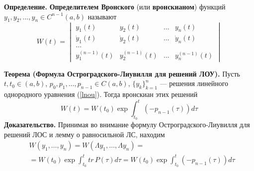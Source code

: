 \documentclass{article}
\begin{document}
\noindent \textbf{Определение.} \textbf{Определителем Вронского} (или \textbf{вронскианом}) функций $y_1, y_2, \ldots, y_n \in C^{n-1}(a,b)$ называют
\begin{equation*}
    W(t) = \begin{vmatrix}
    y_1(t) & y_2(t) & \ldots & y_n(t)\\
    \dot{y}_1(t) & \dot{y}_2(t) & \ldots & \dot{y}_n(t)\\
    \ldots\\
    y_1^{(n-1)}(t) & y_2^{(n-1)}(t) & \ldots & y_n^{(n-1)}(t)
    \end{vmatrix}
\end{equation*}

\noindent \textbf{Теорема (Формула Остроградского-Лиувилля для решений ЛОУ).} Пусть $t, t_0 \in (a,b)$, $p_0, p_1, \ldots, p_{n-1} \in C(a,b)$, $\{y_k\}_{k=1}^n$ --- решения линейного однородного уравнения (\ref{lnou}). Тогда вронскиан этих решений
\begin{equation*}
    W(t) = W(t_0)\exp \int_{t_0}^t (-p_{n-1}(\tau))d\tau
\end{equation*}
\textbf{Доказательство.} Принимая во внимание формулу Остроградского-Лиувилля для решений ЛОС и лемму о равносильной ЛС, находим
\begin{equation*}
    \begin{aligned}
        &W(y_1,\ldots, y_n) = W(\Lambda y_1,\ldots, \Lambda y_n) =\\
        &= W(t_0)\exp \int_{t_0}^t tr\,P(\tau)d\tau = W(t_0)\exp \int_{t_0}^t (-p_{n-1}(\tau))d\tau 
    \end{aligned}
\end{equation*}
\end{document}
